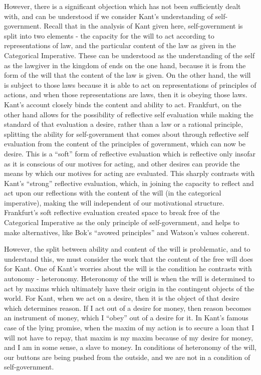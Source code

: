 \documentclass[phd,12pt,oneside,paper=letterpaper]{ubcthesis}
\begin{document}
However, there is a significant objection which has not been sufficiently dealt with, and can be understood if we consider Kant's understanding of self-government. Recall that in the analysis of Kant given here, self-government is split into two elements - the capacity for the will to act according to representations of law, and the particular content of the law as given in the Categorical Imperative. These can be understood as the understanding of the self as the lawgiver in the kingdom of ends on the one hand, because it is from the form of the will that the content of the law is given. On the other hand, the will is subject to those laws because it is able to act on representations of principles of actions, and when those representations are laws, then it is obeying those laws. Kant's account closely binds the content and ability to act. Frankfurt, on the other hand allows for the possibility of reflective self evaluation while making the standard of that evaluation a desire, rather than a law or a rational principle, splitting the ability for self-government that comes about through reflective self evaluation from the content of the principles of government, which can now be desire. This is a ``soft'' form of reflective evaluation which is reflective only insofar as it is conscious of our motives for acting, and other desires can provide the means by which our motives for acting are evaluated. This sharply contrasts with Kant's ``strong'' reflective evaluation, which, in joining the capacity to reflect and act upon our reflections with the content of the will (in the categorical imperative), making the will independent of our motivational structure. Frankfurt's soft reflective evaluation created space to break free of the Categorical Imperative as the only principle of self-government, and helps to make alternatives, like Bok's ``avowed principles'' and Watson's values coherent.

However, the split between ability and content of the will is problematic, and to understand this, we must consider the work that the content of the free will does for Kant. One of Kant's worries about the will is the condition he contrasts with autonomy - heteronomy. Heteronomy of the will is when the will is determined to act by maxims which ultimately have their origin in the contingent objects of the world. For Kant, when we act on a desire, then it is the object of that desire which determines reason. If I act out of a desire for money, then reason becomes an instrument of money, which I ``obey'' out of a desire for it. In Kant's famous case of the lying promise, when the maxim of my action is to secure a loan that I will not have to repay, that maxim is my maxim because of my desire for money, and I am in some sense, a slave to money. In conditions of heteronomy of the will, our buttons are being pushed from the outside, and we are not in a condition of self-government.
\end{document}
